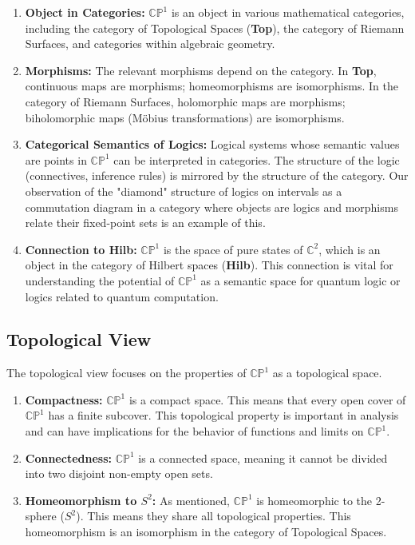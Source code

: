 	\begin{enumerate}
		\item \textbf{Object in Categories:} $\mathbb{CP}^1$ is an object in various mathematical categories, including the category of Topological Spaces (\textbf{Top}), the category of Riemann Surfaces, and categories within algebraic geometry.
		
		\item \textbf{Morphisms:} The relevant morphisms depend on the category. In \textbf{Top}, continuous maps are morphisms; homeomorphisms are isomorphisms. In the category of Riemann Surfaces, holomorphic maps are morphisms; biholomorphic maps (M\"{o}bius transformations) are isomorphisms.
		
		\item \textbf{Categorical Semantics of Logics:} Logical systems whose semantic values are points in $\mathbb{CP}^1$ can be interpreted in categories. The structure of the logic (connectives, inference rules) is mirrored by the structure of the category. Our observation of the "diamond" structure of logics on intervals as a commutation diagram in a category where objects are logics and morphisms relate their fixed-point sets is an example of this.
		
		\item \textbf{Connection to Hilb:} $\mathbb{CP}^1$ is the space of pure states of $\mathbb{C}^2$, which is an object in the category of Hilbert spaces (\textbf{Hilb}). This connection is vital for understanding the potential of $\mathbb{CP}^1$ as a semantic space for quantum logic or logics related to quantum computation.
	\end{enumerate}
	
	\subsection{Topological View}
	
	The topological view focuses on the properties of $\mathbb{CP}^1$ as a topological space.
	
	\begin{enumerate}
		\item \textbf{Compactness:} $\mathbb{CP}^1$ is a compact space. This means that every open cover of $\mathbb{CP}^1$ has a finite subcover. This topological property is important in analysis and can have implications for the behavior of functions and limits on $\mathbb{CP}^1$.
		
		\item \textbf{Connectedness:} $\mathbb{CP}^1$ is a connected space, meaning it cannot be divided into two disjoint non-empty open sets.
		
		\item \textbf{Homeomorphism to $S^2$:} As mentioned, $\mathbb{CP}^1$ is homeomorphic to the 2-sphere ($S^2$). This means they share all topological properties. This homeomorphism is an isomorphism in the category of Topological Spaces.
	\end{enumerate}
	
